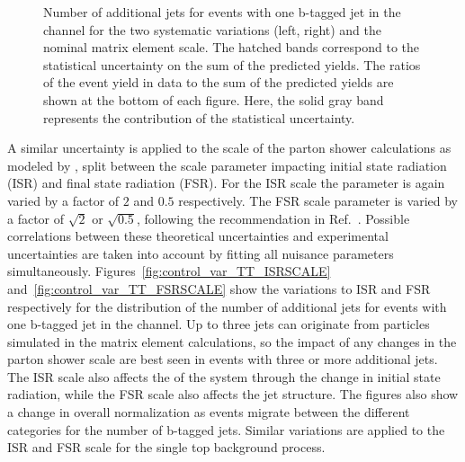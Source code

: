 \begin{figure}[htbp!]
\begin{center}
\caption{Number of additional jets for events with one b-tagged jet in the \emu channel for the two systematic variations (left, right) and the nominal \ttbar matrix element scale.
The hatched bands correspond to the statistical uncertainty on the sum of the predicted yields. 
        The ratios of the event yield in data to the sum of the predicted yields are
        shown at the bottom of each figure. Here, the solid gray band
        represents the contribution of the statistical uncertainty.
  \label{fig:control_var_TT_MESCALE}}
  \end{center}
\end{figure}

A similar uncertainty is applied to the scale of the parton shower calculations as modeled by , split between the scale parameter impacting initial state radiation (ISR) and final state radiation (FSR). 
For the ISR scale the parameter is again varied by a factor of $2$ and $0.5$ respectively. The FSR scale parameter is varied by a factor of $\sqrt{2}$ or $\sqrt{0.5}$, following the recommendation
in Ref.~\cite{Skands:2014pea}. 
Possible correlations between these theoretical uncertainties and  experimental uncertainties 
are taken into account by fitting all nuisance parameters simultaneously.
Figures~\ref{fig:control_var_TT_ISRSCALE}
and~\ref{fig:control_var_TT_FSRSCALE} show the variations to ISR and FSR respectively for the distribution of the number of additional jets for events with one b-tagged jet in the \emu channel.
Up to three jets can originate from particles simulated in the matrix element calculations, so the impact of any changes in the parton shower scale are best seen in events with three or more additional jets.
The ISR scale also affects the \pt of the \ttbar system through the change in initial state radiation, while the FSR scale also affects the jet structure.
The figures also show a change in overall normalization as events migrate between the different categories for the number of b-tagged jets.
Similar variations are applied to the ISR and FSR scale for the single top background process.

